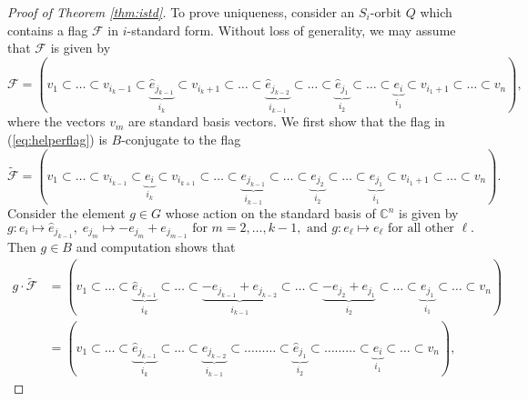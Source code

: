 \documentclass[12pt]{amsart}
\numberwithin{equation}{section}
\theoremstyle{remark}
\theoremstyle{definition}
\newcommand{\fb}{\mbox{${\mathfrak b}$}}
\newcommand{\C}{\mbox{${\mathbb C}$}}
\newcommand{\he}{\hat{e}}
\newcommand{\F}{\mathcal{F}}
\begin{document}
\begin{proof}[Proof of Theorem \ref{thm:istd}]
To prove uniqueness, consider an $S_{i}$-orbit $Q$ which contains a flag $\F$ in $i$-standard form.  
Without loss of generality, we may assume that $\F$ is given by 
\begin{equation}\label{eq:helperflag}
\F=(v_{1}\subset\dots\subset v_{i_{k}-1}\subset\underbrace{ \he_{j_{k-1}}}_{i_{k}}\subset v_{i_{k}+1}\subset \dots \subset \underbrace{\he_{j_{k-2}}}_{i_{k-1}}\subset \dots \subset \underbrace{\he_{j_{1}}}_{i_{2}}\subset \dots\subset \underbrace{e_{i}}_{i_{1}}\subset v_{i_{1}+1}\subset \dots\subset v_{n}),
\end{equation}
where the vectors $v_{m}$ are standard basis vectors.  
 We first show that the flag in (\ref{eq:helperflag}) is $B$-conjugate to the flag 
\begin{equation}\label{eq:wflag}
\tilde{\F}=(v_1 \subset\dots\subset v_{i_{k-1}}\subset\underbrace{e_{i}}_{i_{k}}\subset v_{i_{k+1}}\subset \dots\subset \underbrace{e_{j_{k-1}}}_{i_{k-1}}\subset\dots\subset \underbrace{e_{j_{2}}}_{i_{2}}\subset \dots\subset\underbrace{e_{j_{1}}}_{i_{1}}\subset v_{i_{1}+1}\subset\dots\subset v_{n}).
\end{equation}
  Consider the element $g\in G$ whose action on the standard basis of $\C^{n}$ is given by 
\begin{equation*}
g: e_{i}\mapsto \he_{j_{k-1}},\; e_{j_{m}}\mapsto -e_{j_{m}}+e_{j_{m-1}} \mbox{ for } m=2,\dots, k-1,\mbox{ and } g: e_{\ell}\mapsto e_{\ell} \mbox{ for all other } \ell.
\end{equation*}
Then $g\in B$ and computation shows that
\begin{equation*}
\begin{split}
g\cdot \tilde{\F}&=(v_{1}\subset\dots\subset \underbrace{\he_{j_{k-1}}}_{i_{k}}\subset\dots \subset \underbrace{-e_{j_{k-1}}+e_{j_{k-2}}}_{i_{k-1}}\subset\dots \subset \underbrace{-e_{j_{2}}+e_{j_{1}}}_{i_{2}}\subset \dots\subset \underbrace{e_{j_{1}}}_{i_{1}}\subset\dots \subset v_{n})\\
&=(v_{1}\subset\dots\subset \underbrace{\he_{j_{k-1}}}_{i_{k}}\subset\dots\subset \underbrace{\he_{j_{k-2}}}_{i_{k-1}}\subset\dots\ldots\ldots\subset\underbrace{\he_{j_{1}}}_{i_{2}}\subset\dots\ldots\ldots\subset \underbrace{e_{i}}_{i_{1}}\subset\dots\subset v_{n}),

\end{split}
\end{equation*}
\end{proof}
\end{document}
